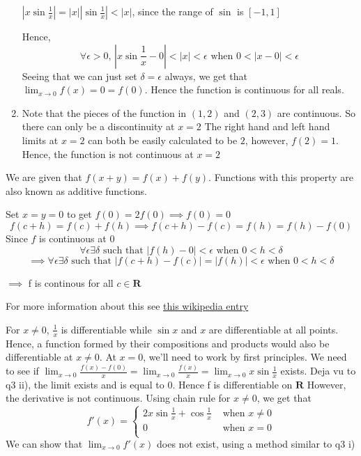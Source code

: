 \documentclass{article}
\begin{document}
\begin{enumerate}
                            $|x\sin \frac{1}{x}| = |x||\sin \frac{1}{x}| < |x|$, since the range of $\sin$ is $[-1, 1]$

                            Hence,
                            $$\forall \epsilon>0, \, |x\sin \frac{1}{x} - 0| < |x| < \epsilon  \text{ when } 0 < |x-0| < \epsilon$$
                            Seeing that we can just set $\delta = \epsilon$ always, we get that $\lim_{x \to 0} f(x) = 0 = f(0)$. Hence the function is continuous for all reals.
                    \item Note that the pieces of the function in $(1,2)$ and $(2,3)$ are continuous. So there can only be a discontinuity at $x = 2$
                            The right hand and left hand limits at $x = 2$ can both be easily calculated to be $2$, however, $f(2) = 1$. Hence, the function is not continuous at $x=2$
        \end{enumerate}
\item We are given that $f(x+y) = f(x) + f(y)$. Functions with this property are also known as additive functions.

        Set $x=y=0$ to get $f(0) = 2f(0) \implies f(0) = 0$
$$f(c+h) = f(c) + f(h) \implies f(c+h)-f(c) = f(h) = f(h)-f(0)$$
    Since $f$ is continuous at $0$
    $$ \forall \epsilon \exists \delta  \text{ such that }|f(h)-0| < \epsilon  \text{ when } 0 < h < \delta$$
    $$\implies \forall \epsilon \exists \delta  \text{ such that } |f(c+h) - f(c)| = |f(h)| < \epsilon\text{ when } 0 < h < \delta$$
    \begin{center}$\implies$ f is continous for all $c \in \mathbf{R}$    

    \end{center}
    For more information about this see \href{https://en.wikipedia.org/wiki/Cauchy\%27s_functional_equation}{this wikipedia entry}

\item For $x \neq 0$, $\frac{1}{x}$ is differentiable while $\sin x$ and $x$ are differentiable at all points. Hence, a function formed by their compositions and products would also be differentiable at $x \neq 0$. At $x = 0$, we'll need to work by first principles.
        We need to see if $\lim_{x\to 0} \frac{f(x)-f(0)}{x} = \lim_{x\to 0} \frac{f(x)}{x} = \lim_{x\to 0} x\sin \frac{1}{x}$ exists. Deja vu to q3 ii), the limit exists and is equal to 0. Hence f is differentiable on $\mathbf{R}$
        However, the derivative is not continuous. Using chain rule for $x\neq 0$, we get that 
        $$f'(x) = \begin{cases}
                    2x \sin \frac{1}{x}+ \cos \frac{1}{x} &  \text{ when } x \neq 0\\
                    0 &  \text{ when } x = 0\\
                \end{cases}
                $$
                We can show that $\lim_{x\to 0} f'(x)$ does not exist, using a method similar to q3 i)
\end{document}
